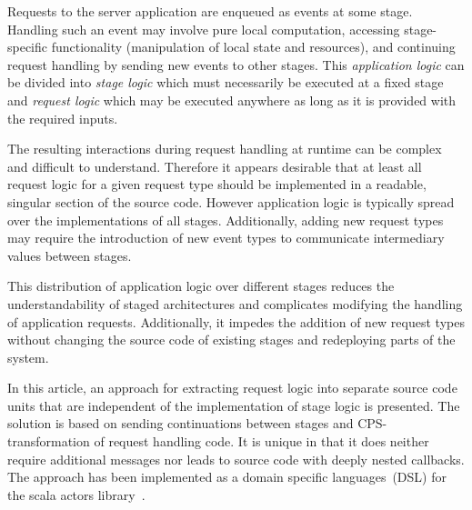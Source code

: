 \documentclass[preprint]{sigplanconf}
\begin{document}
Requests to the server application are enqueued as events at some stage. Handling such an event may
involve pure local computation, accessing stage-specific functionality (manipulation of local state
and resources), and continuing request handling by sending new events to other stages. This
\emph{application logic} can be divided into \emph{stage logic} which must necessarily be executed
at a fixed stage and \emph{request logic} which may be executed anywhere as long as it is provided
with the required inputs.

The resulting interactions during request handling at runtime can be complex and difficult to
understand. Therefore it appears desirable that at least all request logic for a given request type
should be implemented in a readable, singular section of the source code. However application logic
is typically spread over the implementations of all stages.  Additionally, adding new request types 
may require the introduction of new event types to communicate intermediary values between stages.

This distribution of application logic over different stages reduces the understandability of staged
architectures and complicates modifying the handling of application requests. Additionally, it
impedes the addition of new request types without changing the source code of existing stages and
redeploying parts of the system.

In this article, an approach for extracting request logic into separate source code units that are
independent of the implementation of stage logic is presented. The solution is based on sending
continuations between stages and CPS-transformation of request handling code. It is unique
in that it does neither require additional messages nor leads to source code with deeply nested
callbacks. The approach has been implemented as a domain specific languages~(DSL) for the scala
actors library~\cite{Haller:2007}.
                                                 
\end{document}
